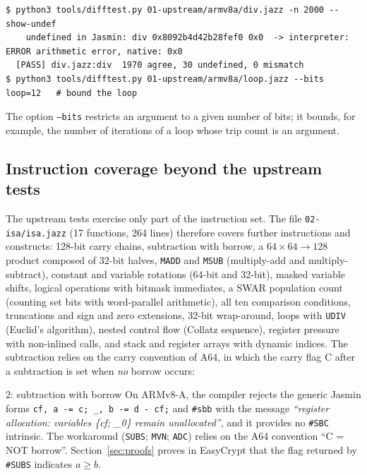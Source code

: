 \documentclass[11pt,a4paper]{article}
\newcommand{\file}[1]{\texttt{#1}}
\begin{document}


\begin{lstlisting}[style=shell]
$ python3 tools/difftest.py 01-upstream/armv8a/div.jazz -n 2000 --show-undef
    undefined in Jasmin: div 0x8092b4d42b28fef0 0x0  -> interpreter: ERROR arithmetic error, native: 0x0
  [PASS] div.jazz:div  1970 agree, 30 undefined, 0 mismatch
$ python3 tools/difftest.py 01-upstream/armv8a/loop.jazz --bits loop=12   # bound the loop
\end{lstlisting}

The option \texttt{--bits} restricts an argument to a given number of bits;
it bounds, for example, the number of iterations of a loop whose trip count
is an argument.

\subsection{Instruction coverage beyond the upstream tests}

The upstream tests exercise only part of the instruction set. The file
\file{02-isa/isa.jazz} (17 functions, 264 lines) therefore covers further
instructions and constructs: 128-bit carry chains, subtraction with borrow,
a $64\times64 \to128$ product composed of 32-bit halves, \texttt{MADD} and
\texttt{MSUB} (multiply-add and multiply-subtract), constant and variable
rotations (64-bit and 32-bit), masked variable shifts, logical operations
with bitmask immediates, a SWAR population count (counting set bits with
word-parallel arithmetic), all ten comparison conditions, truncations and
sign and zero extensions, 32-bit wrap-around, loops with \texttt{UDIV}
(Euclid's algorithm), nested control flow (Collatz sequence), register
pressure with non-inlined calls, and stack and register arrays with dynamic
indices. The subtraction relies on the carry convention of A64, in which the
carry flag C after a subtraction is set when \emph{no} borrow occurs:



\begin{finding}{2: subtraction with borrow}
On ARMv8-A, the compiler rejects the generic Jasmin forms
\lstinline[style=jasmin,numbers=none,frame=none]|cf, a -= c; _, b -= d - cf;|
and \lstinline[style=jasmin,numbers=none,frame=none]|#sbb| with the message
\emph{``register allocation: variables \{cf; \_0\} remain unallocated''},
and it provides no \texttt{\#SBC} intrinsic. The workaround
(\texttt{SUBS}; \texttt{MVN}; \texttt{ADC}) relies on the A64 convention
``C = NOT borrow''. Section~\ref{sec:proofs} proves in EasyCrypt that the
flag returned by \texttt{\#SUBS} indicates $a \ge b$.
\end{finding}
\end{document}
